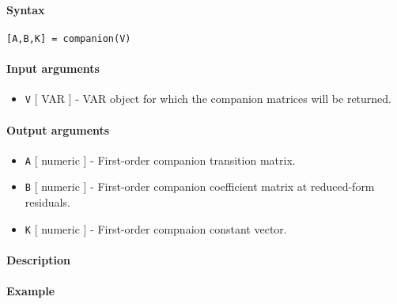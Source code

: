


	\paragraph{Syntax}

\begin{verbatim}
[A,B,K] = companion(V)
\end{verbatim}

\paragraph{Input arguments}

\begin{itemize}
\itemsep1pt\parskip0pt
\item
  \texttt{V} {[} VAR {]} - VAR object for which the companion matrices
  will be returned.
\end{itemize}

\paragraph{Output arguments}

\begin{itemize}
\item
  \texttt{A} {[} numeric {]} - First-order companion transition matrix.
\item
  \texttt{B} {[} numeric {]} - First-order companion coefficient matrix
  at reduced-form residuals.
\item
  \texttt{K} {[} numeric {]} - First-order compnaion constant vector.
\end{itemize}

\paragraph{Description}

\paragraph{Example}


